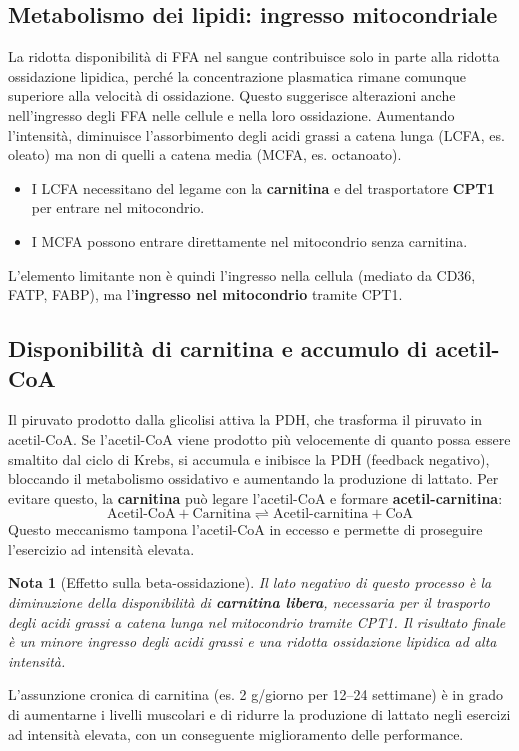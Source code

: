 \documentclass[12pt,a4paper]{report}
\newtheorem{nota}{Nota}[section]
\begin{document}
\subsection{Metabolismo dei lipidi: ingresso mitocondriale}
La ridotta disponibilità di FFA nel sangue contribuisce solo in parte alla ridotta ossidazione lipidica, perché la concentrazione plasmatica rimane comunque superiore alla velocità di ossidazione. Questo suggerisce alterazioni anche nell'ingresso degli FFA nelle cellule e nella loro ossidazione.
Aumentando l'intensità, diminuisce l'assorbimento degli acidi grassi a catena lunga (LCFA, es. oleato) ma non di quelli a catena media (MCFA, es. octanoato).
\begin{itemize}
\item I LCFA necessitano del legame con la \textbf{carnitina} e del trasportatore \textbf{CPT1} per entrare nel mitocondrio.
\item I MCFA possono entrare direttamente nel mitocondrio senza carnitina.
\end{itemize}
L'elemento limitante non è quindi l'ingresso nella cellula (mediato da CD36, FATP, FABP), ma l'\textbf{ingresso nel mitocondrio} tramite CPT1.
\subsection{Disponibilità di carnitina e accumulo di acetil-CoA}
Il piruvato prodotto dalla glicolisi attiva la PDH, che trasforma il piruvato in acetil-CoA. Se l'acetil-CoA viene prodotto più velocemente di quanto possa essere smaltito dal ciclo di Krebs, si accumula e inibisce la PDH (feedback negativo), bloccando il metabolismo ossidativo e aumentando la produzione di lattato.
Per evitare questo, la \textbf{carnitina} può legare l'acetil-CoA e formare \textbf{acetil-carnitina}:
\[
\text{Acetil-CoA} + \text{Carnitina} \rightleftharpoons \text{Acetil-carnitina} + \text{CoA}
\]
Questo meccanismo tampona l'acetil-CoA in eccesso e permette di proseguire l'esercizio ad intensità elevata.
\begin{nota}[Effetto sulla beta-ossidazione]
Il lato negativo di questo processo è la diminuzione della disponibilità di \textbf{carnitina libera}, necessaria per il trasporto degli acidi grassi a catena lunga nel mitocondrio tramite CPT1. Il risultato finale è un minore ingresso degli acidi grassi e una ridotta ossidazione lipidica ad alta intensità.
\end{nota}
L'assunzione cronica di carnitina (es. 2 g/giorno per 12--24 settimane) è in grado di aumentarne i livelli muscolari e di ridurre la produzione di lattato negli esercizi ad intensità elevata, con un conseguente miglioramento delle performance.
\end{document}
